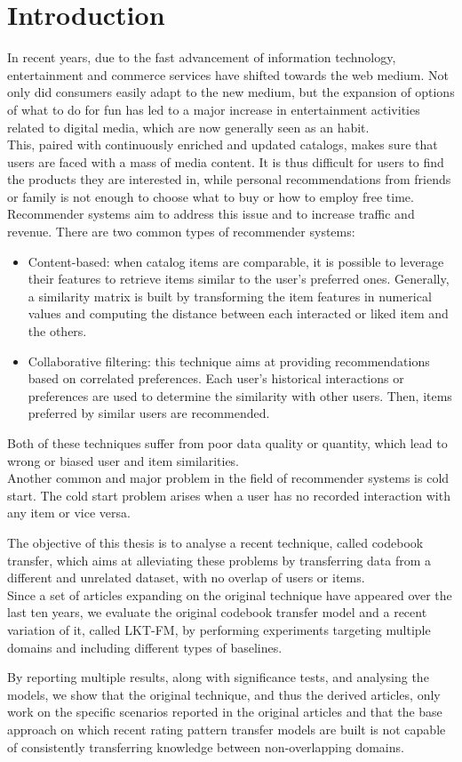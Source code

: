 \chapter{Introduction}

In recent years, due to the fast advancement of information technology, entertainment and commerce services have shifted towards the web medium.
Not only did consumers easily adapt to the new medium, but the expansion of options of what to do for fun has led to a major increase in entertainment activities related to digital media, which are now generally seen as an habit.\\
This, paired with continuously enriched and updated catalogs, makes sure that users are faced with a mass of media content. It is thus difficult for users to find the products they are interested in, while personal recommendations from friends or family is not enough to choose what to buy or how to employ free time. Recommender systems aim to address this issue and to increase traffic and revenue. There are two common types of recommender systems:
\begin{itemize}
\item Content-based: when catalog items are comparable, it is possible to leverage their features to retrieve items similar to the user's preferred ones. Generally, a similarity matrix is built by transforming the item features in numerical values and computing the distance between each interacted or liked item and the others.
\item Collaborative filtering: this technique aims at providing recommendations based on correlated preferences. Each user's historical interactions or preferences are used to determine the similarity with other users. Then, items preferred by similar users are recommended.
\end{itemize}
Both of these techniques suffer from poor data quality or quantity, which lead to wrong or biased user and item similarities.\\
Another common and major problem in the field of recommender systems is cold start.
The cold start problem arises when a user has no recorded interaction with any item or vice versa.\par
The objective of this thesis is to analyse a recent technique, called codebook transfer, which aims at alleviating these problems by transferring data from a different and unrelated dataset, with no overlap of users or items.\\
Since a set of articles expanding on the original technique have appeared over the last ten years, we evaluate the original codebook transfer model and a recent variation of it, called LKT-FM, by performing experiments targeting multiple domains and including different types of baselines.\par
By reporting multiple results, along with significance tests, and analysing the models, we show that the original technique, and thus the derived articles, only work on the specific scenarios reported in the original articles and that the base approach on which recent rating pattern transfer models are built is not capable of consistently transferring knowledge between non-overlapping domains.


